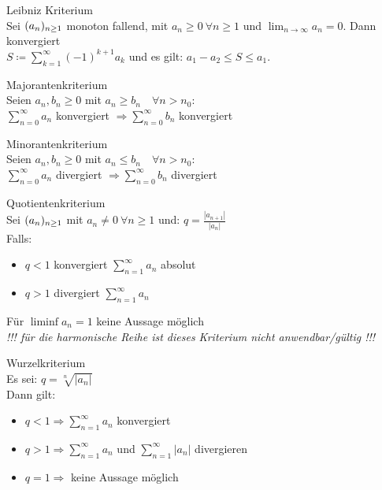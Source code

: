 \begin{concept} {Leibniz Kriterium}\\
    Sei $(a_n)_{n \geq 1}$ monoton fallend, mit $a_n \geq 0~\forall n \geq 1$ und $\lim_{n \to \infty} a_n = 0$. Dann konvergiert\\
    $S \coloneqq \sum_{k = 1}^{\infty} (-1)^{k+1} a_k$
    und es gilt: $a_1 - a_2 \leq S \leq a_1$.
\end{concept}

\begin{concept} {Majorantenkriterium}\\
    Seien $a_n, b_n \geq 0$ mit $a_n \geq b_n \quad \forall n > n_0$:\\
    $\sum_{n=0}^\infty a_n$ konvergiert $\Rightarrow \sum_{n=0}^\infty b_n$ konvergiert
\end{concept}

\begin{concept} {Minorantenkriterium}\\
    Seien $a_n, b_n \geq 0$ mit $a_n \leq b_n \quad \forall n > n_0$:\\
    $\sum_{n=0}^\infty a_n$ divergiert $\Rightarrow \sum_{n=0}^\infty b_n$ divergiert
\end{concept}

\begin{concept} {Quotientenkriterium}\\
    Sei $(a_n)_{n \geq 1}$ mit $a_n \neq 0~\forall n \geq 1$ und: $q = \frac{|a_{n + 1}|}{|a_n|}$\\
    Falls:
    \begin{itemize}
        \item $q < 1$ konvergiert $\sum_{n=1}^\infty a_n$ absolut
        \item $q > 1$ divergiert $\sum_{n=1}^\infty a_n$
    \end{itemize}
    Für $\liminf a_n = 1$ keine Aussage möglich\\
    \emph{!!! für die harmonische Reihe ist dieses Kriterium nicht anwendbar/gültig !!!}
\end{concept}

\begin{concept} {Wurzelkriterium}\\
    Es sei: $q = \sqrt[n]{|a_n|}$\\
    Dann gilt:
    \begin{itemize}
        \item $q < 1 \Rightarrow \sum_{n=1}^\infty a_n$ konvergiert
        \item $q > 1 \Rightarrow \sum_{n=1}^\infty a_n$ und $\sum_{n=1}^\infty |a_n|$ divergieren
        \item $q = 1 \Rightarrow$ keine Aussage möglich
    \end{itemize}
\end{concept}

